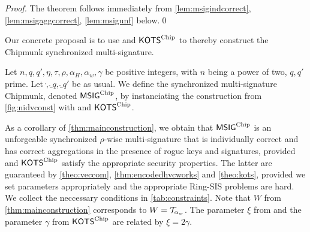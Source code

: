 \begin{proof}
  The theorem follows immediately from \autoref{lem:msigindcorrect}, \autoref{lem:msigaggcorrect}, \autoref{lem:msigunf} below.\qed
\end{proof}

Our concrete proposal is to use \eprint{$\hvcencoded$}\cameraready{$\hvccamera$} and $\mathsf{KOTS}^{\textup{Chip}}$ to thereby construct the Chipmunk synchronized multi-signature.
\begin{definition}\label{def:actual_chipmunk}
Let $n, q, q', \eta, \tau, \rho, \alpha_H, \alpha_w, \gamma$ be positive integers, with $n$ being a power of two, $q, q'$ prime.
Let $\ring, \ring_q, \ring_{q'}$ be as usual. We define the synchronized multi-signature Chipmunk, denoted $\mathsf{MSIG}^{\textup{Chip}}$, by instanciating the construction from \autoref{fig:nidvconst} with \eprint{$\hvcencoded$}\cameraready{$\hvccamera$} and $\mathsf{KOTS}^{\textup{Chip}}$.
\end{definition}
As a corollary of \autoref{thm:mainconstruction}, we obtain that $\mathsf{MSIG}^{\textup{Chip}}$ is an unforgeable synchronized $\rho$-wise multi-signature that is individually correct and has correct aggregations in the presence of rogue keys and signatures,
provided \eprint{$\hvcencoded$}\cameraready{$\hvccamera$} and $\mathsf{KOTS}^{\textup{Chip}}$ satisfy the appropriate security properties. The latter are guaranteed by \autoref{theo:veccom}, \autoref{thm:encodedhvcworks} and \autoref{theo:kots}, provided we set parameters appropriately and the appropriate Ring-SIS problems are hard.
We collect the neccessary conditions in \autoref{tab:constraints}. Note that $W$ from \autoref{thm:mainconstruction} corresponds to $W = \mathcal{T}_{\alpha_w}$. The parameter $\xi$ from \eprint{$\hvcencoded$}\cameraready{$\hvccamera$} and the parameter $\gamma$ from $\mathsf{KOTS}^{\textup{Chip}}$ are related by $\xi = 2\gamma$.

